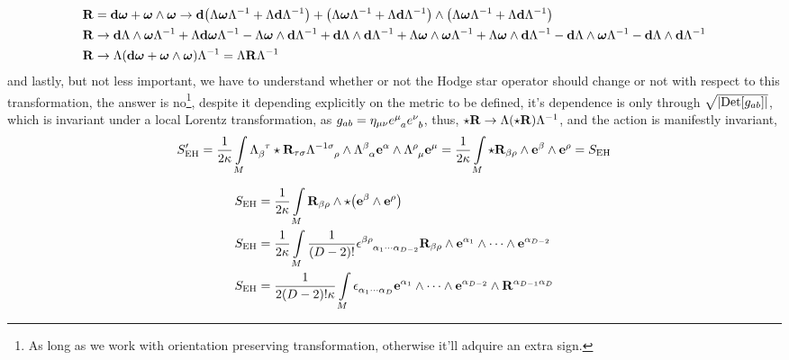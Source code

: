 \begin{align*}
    \vb R&=\vb d\boldsymbol\omega+\boldsymbol\omega\wedge\boldsymbol\omega\rightarrow \vb d\qty(\Lambda\boldsymbol\omega\Lambda^{-1}+\Lambda\vb d\Lambda^{-1})+\qty(\Lambda\boldsymbol\omega\Lambda^{-1}+\Lambda\vb d\Lambda^{-1})\wedge\qty(\Lambda\boldsymbol\omega\Lambda^{-1}+\Lambda\vb d\Lambda^{-1})\\
    \vb R&\rightarrow \vb d\Lambda\wedge\boldsymbol\omega\Lambda^{-1}+\Lambda\vb d\boldsymbol\omega\Lambda^{-1}-\Lambda\boldsymbol\omega\wedge\vb d\Lambda^{-1}+\vb d\Lambda\wedge\vb d\Lambda^{-1}+\Lambda\boldsymbol\omega\wedge\boldsymbol\omega\Lambda^{-1}+\Lambda\boldsymbol\omega\wedge\vb d\Lambda^{-1}-\vb d\Lambda\wedge\boldsymbol\omega\Lambda^{-1}-\vb d\Lambda\wedge\vb d\Lambda^{-1}\\
    \vb R&\rightarrow \Lambda\qty(\vb d\boldsymbol\omega+\boldsymbol\omega\wedge\boldsymbol\omega)\Lambda^{-1}=\Lambda\vb R\Lambda^{-1}
\end{align*}
and lastly, but not less important, we have to understand whether or not the Hodge star operator should change or not with respect to this transformation, the answer is no\footnote{As long as we work with orientation preserving transformation, otherwise it'll adquire an extra sign.}, despite it depending explicitly on the 
metric to be defined, it's dependence is only through $\sqrt{\abs{\textup{Det} \qty[g_{ab}]}}$, which is invariant under a local Lorentz transformation, as $g_{ab}=\eta_{\mu\nu}\tensor{e}{^\mu_a}\tensor{e}{^\nu_b}$, thus, $\star\vb R\rightarrow \Lambda\qty(\star\vb R)\Lambda^{-1}$, and the action is manifestly invariant,
\begin{align*}
    S_{\textnormal{EH}}'=\frac{1}{2\kappa}\int\limits_M\tensor{\Lambda}{_\beta^\tau}\star\vb R_{\tau\sigma}\tensor{\Lambda}{^{-1}^\sigma_\rho}\wedge\tensor{\Lambda}{^\beta_\alpha}\vb e^\alpha\wedge\tensor{\Lambda}{^\rho_\mu}\vb e^\mu=\frac{1}{2\kappa}\int\limits_M\star\vb R_{\beta\rho}\wedge\vb e^{\beta}\wedge\vb e^{\rho}=S_{\textnormal{EH}}
\end{align*}





\begin{align*}
    S_{\textnormal{EH}}&=\frac{1}{2\kappa}\int\limits_M\vb R_{\beta\rho}\wedge\star\qty(\vb e^{\beta}\wedge\vb e^{\rho})\\
    S_{\textnormal{EH}}&=\frac{1}{2\kappa}\int\limits_M\frac{1}{\qty(D-2)!}\tensor{\epsilon}{^\beta^\rho_{\alpha_1}_\cdots_{\alpha_{D-2}}}\vb R_{\beta\rho}\wedge\vb e^{\alpha_1}\wedge\cdots\wedge\vb e^{\alpha_{D-2}}\\
    S_{\textnormal{EH}}&=\frac{1}{2\qty(D-2)!\kappa}\int\limits_M\tensor{\epsilon}{_{\alpha_1}_\cdots_{\alpha_{D}}}\vb e^{\alpha_1}\wedge\cdots\wedge\vb e^{\alpha_{D-2}}\wedge\vb R^{\alpha_{D-1}\alpha_{D}}
\end{align*}

